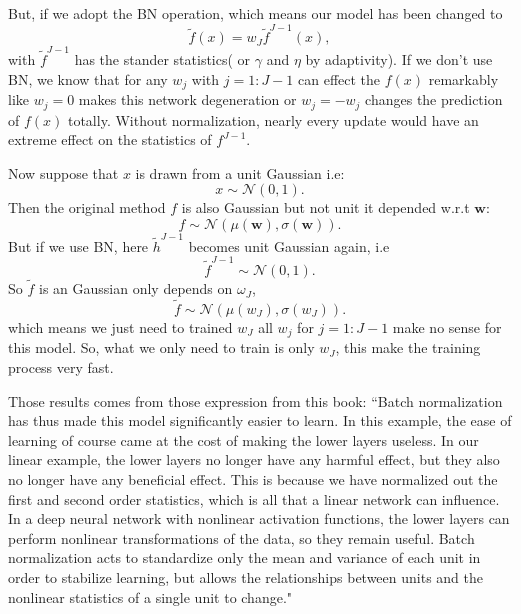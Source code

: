 But, if we adopt the BN operation, which means our model has been changed to
\begin{equation}
\tilde f(x) = w_J \tilde f^{J-1}(x),
\end{equation}
with $\tilde f^{J-1}$ has the stander statistics( or $\gamma$ and $\eta$ by adaptivity). If we don't use BN, we know that for any $w_j$ with $j = 1:J-1$ can effect the $f(x)$ remarkably like $w_j = 0$ makes this network degeneration or $w_j = -w_j$ changes the prediction of $f(x)$ totally. Without normalization, nearly every update would have an extreme effect on the statistics of $f^{J-1}$.

Now suppose that $x$ is drawn from a unit Gaussian i.e:
\begin{equation}
x \sim \mathcal{N}(0,1).
\end{equation}
 Then the original method $f$ is also Gaussian but not unit it depended w.r.t $\bm{w}$:
\begin{equation}
f \sim \mathcal{N}(\mu({\bm{w}}),\sigma(\bm{w})).
\end{equation}
But if we use BN, here $\tilde h^{J-1}$ becomes unit Gaussian again, i.e
\begin{equation}
\tilde f^{J-1} \sim \mathcal{N}(0,1).
\end{equation}  So $\tilde f$ is an Gaussian only depends on $\omega_J$,
\begin{equation}
\tilde f \sim \mathcal{N}(\mu(w_J),\sigma(w_J)).
\end{equation}  which means we just need to trained $w_J$ all $w_j$ for $j=1:J-1$ make no sense for this model. So, what we only need to train is only $w_J$, this make the training process very fast.

Those results comes from those expression from this book:
``Batch normalization has thus made this model significantly easier to learn. In this example, the ease of learning of course came at the cost of making the lower layers useless. In our linear example, the lower layers no longer have any harmful effect, but they also no longer have any beneficial effect. This is because we have normalized out the first and second order statistics, which is all that a linear network can influence. In a deep neural network with nonlinear activation functions, the lower layers can perform nonlinear transformations of the data, so they remain useful. Batch normalization acts to standardize only the mean and variance of each unit in order to stabilize learning, but allows the relationships between units and the nonlinear statistics of a single unit to change."

